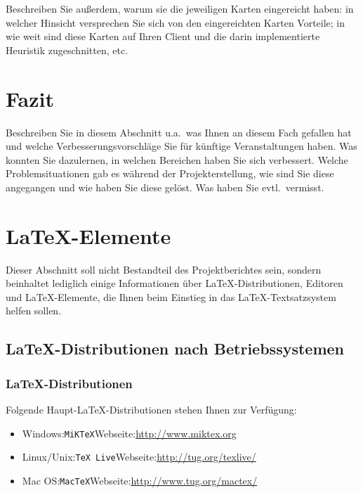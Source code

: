 \documentclass[12pt,a4paper,bibliography=totocnumbered,listof=totocnumbered]{scrartcl}
\begin{document}
Beschreiben Sie außerdem, warum sie die jeweiligen Karten eingereicht haben: in welcher Hinsicht versprechen Sie sich von den eingereichten Karten Vorteile; in wie weit sind diese Karten auf Ihren Client und die darin implementierte Heuristik zugeschnitten, etc.


\newpage
\section{Fazit}
Beschreiben Sie in diesem Abschnitt u.a.\ was Ihnen an diesem Fach gefallen hat und welche Verbesserungsvorschläge Sie für künftige Veranstaltungen haben. Was konnten Sie dazulernen, in welchen Bereichen haben Sie sich verbessert. Welche Problemsituationen gab es während der Projekterstellung, wie sind Sie diese angegangen und wie haben Sie diese gelöst. Was haben Sie evtl.\ vermisst.


\newpage
\section{\LaTeX-Elemente}
Dieser Abschnitt soll nicht Bestandteil des Projektberichtes sein, sondern beinhaltet lediglich einige Informationen über \LaTeX-Distributionen, Editoren und \LaTeX-Elemente, die Ihnen beim Einstieg in das \LaTeX-Textsatzsystem helfen sollen.

\subsection{\LaTeX-Distributionen nach Betriebssystemen}

\subsubsection{\LaTeX-Distributionen}
Folgende Haupt-\LaTeX-Distributionen stehen Ihnen zur Verfügung:
\begin{itemize}
  \item Windows:\quad \texttt{MiKTeX}\quad Webseite:\quad\url{http://www.miktex.org}
  \item Linux/Unix:\quad \texttt{TeX Live}\quad Webseite:\quad\url{http://tug.org/texlive/}
  \item Mac OS:\quad \texttt{MacTeX}\quad Webseite:\quad\url{http://www.tug.org/mactex/}
\end{itemize}
\end{document}
